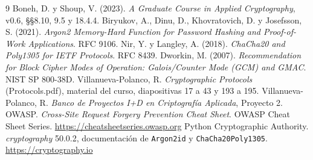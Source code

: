 \documentclass[11pt,letterpaper]{article}
\newcommand{\code}[1]{\texttt{#1}}
\begin{document}
\begin{thebibliography}{9}\small
\setlength{\itemsep}{1pt}
 Boneh, D. y Shoup, V. (2023). \emph{A Graduate Course in Applied Cryptography}, v0.6, §§8.10, 9.5 y 18.4.4.
 Biryukov, A., Dinu, D., Khovratovich, D. y Josefsson, S. (2021). \emph{Argon2 Memory-Hard Function for Password Hashing and Proof-of-Work Applications}. RFC 9106.
 Nir, Y. y Langley, A. (2018). \emph{ChaCha20 and Poly1305 for IETF Protocols}. RFC 8439.
 Dworkin, M. (2007). \emph{Recommendation for Block Cipher Modes of Operation: Galois/Counter Mode (GCM) and GMAC}. NIST SP 800-38D.
 Villanueva-Polanco, R. \emph{Cryptographic Protocols} (Protocols.pdf), material del curso, diapositivas 17 a 43 y 193 a 195.
 Villanueva-Polanco, R. \emph{Banco de Proyectos I+D en Criptografía Aplicada}, Proyecto 2.
 OWASP. \emph{Cross-Site Request Forgery Prevention Cheat Sheet}. OWASP Cheat Sheet Series. \url{https://cheatsheetseries.owasp.org}
 Python Cryptographic Authority. \emph{cryptography} 50.0.2, documentación de \code{Argon2id} y \code{ChaCha20Poly1305}. \url{https://cryptography.io}
\end{thebibliography}
\end{document}

